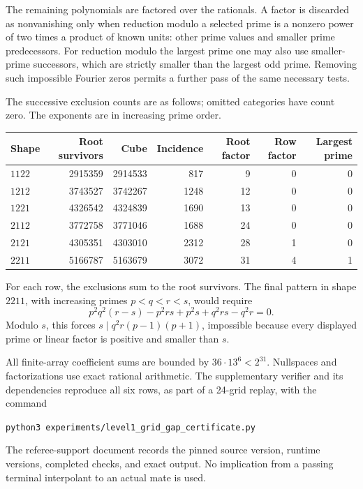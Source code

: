 The remaining polynomials are factored over the rationals. A factor is
discarded as nonvanishing only when reduction modulo a selected prime
is a nonzero power of two times a product of known units: other prime
values and smaller prime predecessors. For reduction modulo the largest
prime one may also use smaller-prime successors, which are strictly
smaller than the largest odd prime. Removing such impossible Fourier
zeros permits a further pass of the same necessary tests.

The successive exclusion counts are as follows; omitted categories have
count zero. The exponents are in increasing prime order.
\begin{center}
\small
\begin{tabular}{lrrrrrr}
\hline
Shape & Root survivors & Cube & Incidence & Root factor & Row factor & Largest prime\\
\hline
\(1122\)&2915359&2914533&817&9&0&0\\
\(1212\)&3743527&3742267&1248&12&0&0\\
\(1221\)&4326542&4324839&1690&13&0&0\\
\(2112\)&3772758&3771046&1688&24&0&0\\
\(2121\)&4305351&4303010&2312&28&1&0\\
\(2211\)&5166787&5163679&3072&31&4&1\\
\hline
\end{tabular}
\end{center}
For each row, the exclusions sum to the root survivors. The final
pattern in shape \(2211\), with increasing primes \(p<q<r<s\),
would require
\[
p^2q^2(r-s)-p^2rs+p^2s+q^2rs-q^2r=0.
\]
Modulo \(s\), this forces
\(s\mid q^2r(p-1)(p+1)\), impossible because every displayed
prime or linear factor is positive and smaller than \(s\).

All finite-array coefficient sums are bounded by
\(36\cdot13^6<2^{31}\). Nullspaces and factorizations use exact
rational arithmetic. The supplementary verifier and its dependencies
reproduce all six rows, as part of a 24-grid replay, with the command
\begin{center}
\small\texttt{python3 experiments/level1\_grid\_gap\_certificate.py}
\end{center}
The referee-support document records the pinned source version, runtime
versions, completed checks, and exact output. No implication from a
passing terminal interpolant to an actual mate is used.
